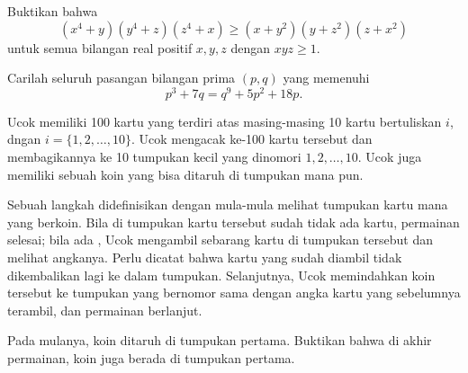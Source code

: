 \documentclass[12pt]{scrartcl}
\begin{document}
	\begin{soalbaru}
		Buktikan bahwa 
		\[ (x^4+y)(y^4+z)(z^4+x) \geq (x+y^2)(y+z^2)(z+x^2) \] untuk semua bilangan real positif $x, y, z$ dengan $xyz \geq 1$.
	\end{soalbaru}

	\begin{soalbaru}
		Carilah seluruh pasangan bilangan prima $(p, q)$ yang memenuhi
		\[ p^3+7q=q^9+5p^2+18p. \]
	\end{soalbaru}

	
	\begin{soalbaru}
	Ucok memiliki 100 kartu yang terdiri atas masing-masing 10 kartu bertuliskan $i$, dngan $i=\{1,2,\dots,10\}$. Ucok mengacak ke-100 kartu tersebut dan membagikannya ke 10 tumpukan kecil yang dinomori $1,2,\dots, 10$. Ucok juga memiliki sebuah koin yang bisa ditaruh di tumpukan mana pun.
	
	Sebuah langkah didefinisikan dengan mula-mula melihat tumpukan kartu mana yang berkoin. Bila di tumpukan kartu tersebut sudah tidak ada kartu, permainan selesai; bila ada , Ucok mengambil sebarang kartu di tumpukan tersebut dan melihat angkanya. Perlu dicatat bahwa kartu yang sudah diambil tidak dikembalikan lagi ke dalam tumpukan. Selanjutnya, Ucok memindahkan koin tersebut ke tumpukan yang bernomor sama dengan angka kartu yang sebelumnya terambil, dan permainan berlanjut.
	
	Pada mulanya, koin ditaruh di tumpukan pertama. Buktikan bahwa di akhir permainan, koin juga berada di tumpukan pertama.
	\end{soalbaru}


	
\end{document}

